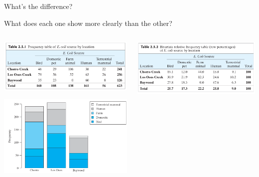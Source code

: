 \begin{frame}{What's the difference?}

  What does each one show more clearly than the other?

    \begin{columns}
        \begin{column}{0.5\textwidth}
    \begin{center}
            \includegraphics[width=.9\textwidth]{ecoli-counts-tab2_5_1.png}

            \includegraphics[width=.9\textwidth]{ecoli-counts-fig2_5_1.png}
    \end{center}
        \end{column}

        \begin{column}{0.5\textwidth}

    \begin{center}
            \includegraphics[width=.9\textwidth]{ecoli-freqs-tab2_5_2.png}


\end{center}
\end{column}
\end{columns}
\end{frame}
